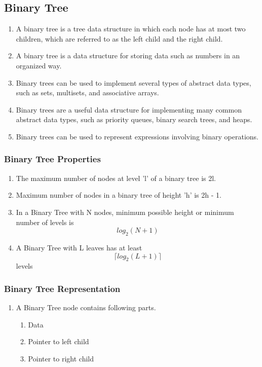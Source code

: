 \documentclass[11pt]{article}
\begin{document}
\subsection{Binary Tree}
    \begin{enumerate}
    \item A binary tree is a tree data structure in which each node has at most two children, which are referred to as the left child and the right child.
    \item A binary tree is a data structure for storing data such as numbers in an organized way.
    \item Binary trees can be used to implement several types of abstract data types, such as sets, multisets, and associative arrays.
    \item Binary trees are a useful data structure for implementing many common abstract data types, such as priority queues, binary search trees, and heaps.
    \item Binary trees can be used to represent expressions involving binary operations.
\end{enumerate}

\subsubsection{Binary Tree Properties}
\begin{enumerate}
    \item The maximum number of nodes at level 'l' of a binary tree is 2l.
    \item Maximum number of nodes in a binary tree of height 'h' is 2h - 1.
    \item In a Binary Tree with N nodes, minimum possible height or minimum number of levels is \[log_2(N+1)\]
    \item A Binary Tree with L leaves has at least \[\lceil log_2(L+1)\rceil\] levels
\end{enumerate}

\subsubsection{Binary Tree Representation}
\begin{enumerate}
    \item A Binary Tree node contains following parts.
    \begin{enumerate}
        \item Data
        \item Pointer to left child
        \item Pointer to right child
    \end{enumerate}
\end{enumerate}
\end{document}
